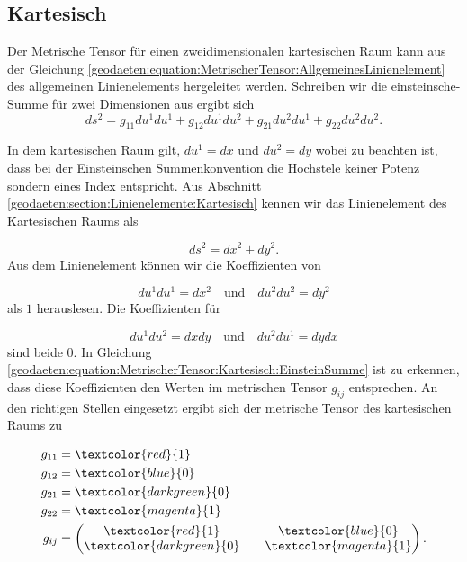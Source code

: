 %
%
%
%
\subsection{Kartesisch\label{geodaeten:section:MetrischerTensor:Kartesisch}}

Der Metrische Tensor für einen zweidimensionalen kartesischen Raum kann aus der Gleichung \eqref{geodaeten:equation:MetrischerTensor:AllgemeinesLinienelement} des allgemeinen Linienelements hergeleitet werden.
Schreiben wir die einsteinsche-Summe für zwei Dimensionen aus ergibt sich
\begin{equation}
	ds^2 = g_{11}  du^1  du^1 + g_{12}  du^1  du^2 + g_{21}  du^2  du^1 + g_{22}  du^2  du^2 .
	\label{geodaeten:equation:MetrischerTensor:Kartesisch:EinsteinSumme}
\end{equation}

In dem kartesischen Raum gilt, $du^1 = dx$ und $du^2 = dy$ wobei zu beachten ist, dass bei der Einsteinschen Summenkonvention die Hochstele keiner Potenz sondern eines Index entspricht.
Aus Abschnitt \ref{geodaeten:section:Linienelemente:Kartesisch} kennen wir das Linienelement des Kartesischen Raums als

\begin{equation}
	ds^2 = dx^2 + dy^2 .
\end{equation}
Aus dem Linienelement können wir die Koeffizienten von 

\begin{equation}
du^1 du^1 = dx^2 \quad \text{und} \quad du^2  du^2 = dy^2 
\end{equation}
als $1$ herauslesen.
Die Koeffizienten für

\begin{equation}
du^1  du^2 = dx  dy \quad \text{und} \quad du^2  du^1 = dy  dx
\end{equation}
sind beide $0$.
In Gleichung \ref{geodaeten:equation:MetrischerTensor:Kartesisch:EinsteinSumme} ist zu erkennen, dass diese Koeffizienten den Werten im metrischen Tensor $g_{ij}$ entsprechen.
An den richtigen Stellen eingesetzt ergibt sich der metrische Tensor des kartesischen Raums zu

\begin{equation}
	\begin{aligned}
		g_{11} &= \textcolor{red}{1} \\
		g_{12} &= \textcolor{blue}{0} \\
		g_{21} &= \textcolor{darkgreen}{0} \\
		g_{22} &= \textcolor{magenta}{1} \\
		g_{ij} &= \begin{pmatrix} \textcolor{red}{1} && \textcolor{blue}{0} \\ \textcolor{darkgreen}{0} && \textcolor{magenta}{1} \end{pmatrix} .
	\end{aligned}
\end{equation}

